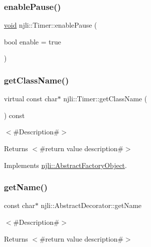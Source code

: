 \subsubsection{\texorpdfstring{enable\+Pause()}{enablePause()}}
{\footnotesize\ttfamily \mbox{\hyperlink{_thread_8h_af1e856da2e658414cb2456cb6f7ebc66}{void}} njli\+::\+Timer\+::enable\+Pause (\begin{DoxyParamCaption}\item[{bool}]{enable = {\ttfamily true} }\end{DoxyParamCaption})}

\mbox{\label{classnjli_1_1_timer_a6a6519d8ec6e61474342ee6ead61fa6d}} 
\subsubsection{\texorpdfstring{get\+Class\+Name()}{getClassName()}}
{\footnotesize\ttfamily virtual const char$\ast$ njli\+::\+Timer\+::get\+Class\+Name (\begin{DoxyParamCaption}{ }\end{DoxyParamCaption}) const\hspace{0.3cm}{\ttfamily [virtual]}}

$<$\#\+Description\#$>$

\begin{DoxyReturn}{Returns}
$<$\#return value description\#$>$ 
\end{DoxyReturn}


Implements \mbox{\hyperlink{classnjli_1_1_abstract_factory_object_af4151e41b80d5bc3fc42822c67fc2278}{njli\+::\+Abstract\+Factory\+Object}}.

\mbox{\label{classnjli_1_1_timer_ad41266885be835f3ee602311e20877a4}} 
\subsubsection{\texorpdfstring{get\+Name()}{getName()}}
{\footnotesize\ttfamily const char$\ast$ njli\+::\+Abstract\+Decorator\+::get\+Name}

$<$\#\+Description\#$>$

\begin{DoxyReturn}{Returns}
$<$\#return value description\#$>$ 
\end{DoxyReturn}
\mbox{\label{classnjli_1_1_timer_ac4ca71716ed832be357f15f8262c8448}} 
